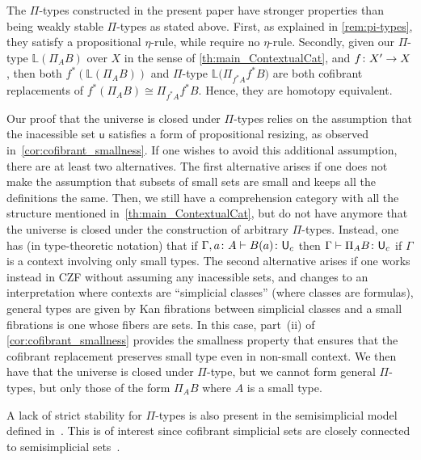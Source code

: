 \documentclass[reqno,10pt,a4paper,oneside,draft]{amsart}
\begin{document}
\begin{remark}
The $\Pi$-types constructed in the present paper have stronger properties than being weakly stable $\Pi$-types as stated above. First, as explained in \cref{rem:pi-types}, they satisfy a propositional $\eta$-rule, while \cite{LumsdaineP:locuoc} require no $\eta$-rule. Secondly, given our $\Pi$-type $\mathbb{L}(\Pi_A B)$ over $X$ in the sense of \cref{th:main_ContextualCat}, and $f \colon X'  \rightarrow X$, then  both $f^*( \mathbb{L} ( \Pi_A B ))$ and $\Pi$-type $\mathbb{L} \big( \Pi_{f^* A} f^* B \big)$ are both cofibrant replacements of $f^* (\Pi_A B) \cong \Pi_{f^*A} f^* B $. Hence, they are homotopy equivalent. 
\end{remark}


\begin{remark} \label{rem:strength}
Our proof that the universe is closed under $\Pi$-types relies on the assumption that the inacessible set $\mathsf{u}$ satisfies a form of propositional resizing, as observed in~\cref{cor:cofibrant_smallness}. If one wishes to avoid this additional assumption, there are at least two alternatives.
The first alternative arises if one does not make the assumption that subsets of small sets are small and keeps all the definitions the same. Then, we still have a comprehension category with all the structure mentioned in~\cref{th:main_ContextualCat}, but do not have anymore that the universe is closed under the construction of arbitrary $\Pi$-types. Instead, one has (in type-theoretic notation) that if  $\Gamma, a \colon A \vdash B(a) \colon \mathsf{U}_c$ then $\Gamma \vdash \Pi_A B \colon \mathsf{U}_c$ if $\Gamma$ is a context  involving only small types. The second alternative arises if one works instead in CZF without assuming any inacessible sets, and changes to an interpretation where contexts are ``simplicial classes'' (where classes are formulas), general types are given by Kan fibrations between simplicial classes and a small fibrations is one whose fibers are sets. In this case, part~(ii) of \cref{cor:cofibrant_smallness}  provides the smallness property that ensures that the cofibrant replacement preserves small type even in non-small context.  We then   have that the universe is closed under $\Pi$-type, but we cannot form general  $\Pi$-types, but only those of the form $\Pi_A B$ where $A$ is a small type.
\end{remark}


\begin{remark} A lack of strict stability for $\Pi$-types is also present in the semisimplicial
model defined in~\cite{CoquandT:gentgi}. This is of interest since cofibrant simplicial
sets are closely connected to semisimplicial sets~\cite{henry2019qms}. 
\end{remark} 
\end{document}
